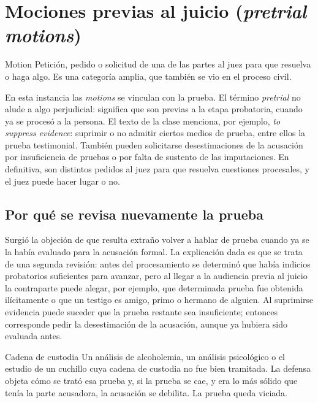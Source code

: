 \documentclass[12pt,oneside]{book}
\begin{document}
\section{Mociones previas al juicio (\textit{pretrial motions})}

\begin{definition}{Motion}
Petición, pedido o solicitud de una de las partes al juez para que resuelva o haga algo. Es una categoría amplia, que también se vio en el proceso civil.
\end{definition}

En esta instancia las \textit{motions} se vinculan con la prueba. El término \textit{pretrial} no alude a algo perjudicial: significa que son previas a la etapa probatoria, cuando ya se procesó a la persona. El texto de la clase menciona, por ejemplo, \textit{to suppress evidence}: suprimir o no admitir ciertos medios de prueba, entre ellos la prueba testimonial. También pueden solicitarse desestimaciones de la acusación por insuficiencia de pruebas o por falta de sustento de las imputaciones. En definitiva, son distintos pedidos al juez para que resuelva cuestiones procesales, y el juez puede hacer lugar o no.

\subsection{Por qué se revisa nuevamente la prueba}

Surgió la objeción de que resulta extraño volver a hablar de prueba cuando ya se la había evaluado para la acusación formal. La explicación dada es que se trata de una segunda revisión: antes del procesamiento se determinó que había indicios probatorios suficientes para avanzar, pero al llegar a la audiencia previa al juicio la contraparte puede alegar, por ejemplo, que determinada prueba fue obtenida ilícitamente o que un testigo es amigo, primo o hermano de alguien. Al suprimirse evidencia puede suceder que la prueba restante sea insuficiente; entonces corresponde pedir la desestimación de la acusación, aunque ya hubiera sido evaluada antes.

\begin{example}{Cadena de custodia}
Un análisis de alcoholemia, un análisis psicológico o el estudio de un cuchillo cuya cadena de custodia no fue bien tramitada. La defensa objeta cómo se trató esa prueba y, si la prueba se cae, y era lo más sólido que tenía la parte acusadora, la acusación se debilita. La prueba queda viciada.
\end{example}
\end{document}
